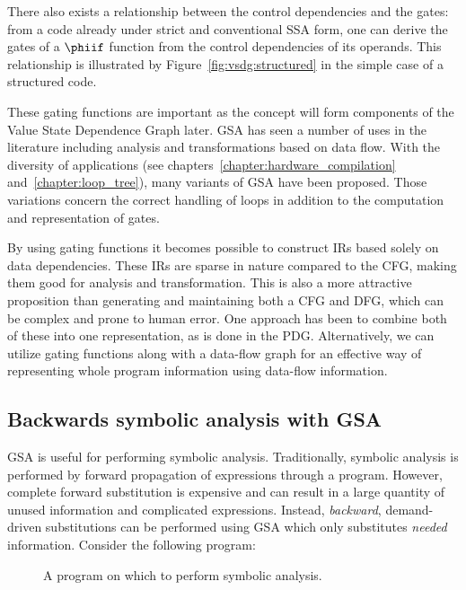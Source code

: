There also exists a relationship between the control dependencies and the gates: 
from a code already under strict and conventional SSA form, one can derive the gates of a $\phiif$ function from the control dependencies of its operands. 
This relationship is illustrated by Figure~\ref{fig:vsdg:structured} in the simple case of a structured code.
 
These gating functions are important as the concept will form components of the Value State Dependence Graph later. 
GSA has seen a number of uses in the literature including analysis and transformations based on data flow. 
With the diversity of applications (see chapters~\ref{chapter:hardware_compilation} and~\ref{chapter:loop_tree}), many variants of GSA have been proposed. 
Those variations concern the correct handling of loops in addition to the computation and representation of gates.


By using gating functions it becomes possible to construct IRs based solely on data dependencies. 
These IRs are sparse in nature compared to the CFG, making them good for analysis and transformation. 
This is also a more attractive proposition than generating and maintaining both a CFG and DFG, which can be complex and prone to human error. 
One approach has been to combine both of these into one representation, as is done in the PDG. 
Alternatively, we can utilize gating functions along with a data-flow graph for an effective way of representing whole program information using data-flow information.

\subsection{Backwards symbolic analysis with GSA}
GSA is useful for performing symbolic analysis. 
Traditionally, symbolic analysis is performed by forward propagation of expressions through a program. 
However, complete forward substitution is expensive and can result in a large quantity of unused information and complicated expressions. 
Instead, \textit{backward}, demand-driven substitutions can be performed using GSA which only substitutes \textit{needed} information. 
Consider the following program:

\begin{figure*}[ht]
\centering
{}
\caption{A program on which to perform symbolic analysis.}
\label{fig:tupaduaexample}
\end{figure*}

